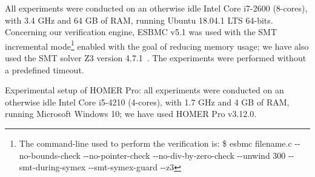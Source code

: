 \documentclass[journal]{IEEEtran}
\begin{document}
All experiments were conducted on an otherwise idle Intel Core i7-2600 (8-cores), with 3.4 GHz and 64 GB of RAM, running Ubuntu 18.04.1 LTS 64-bits. Concerning our verification engine, ESBMC v5.1 was used with the SMT incremental mode\footnote{The command-line used to perform the verification is: \$ esbmc filename.c -\phantom{}-no-bounds-check -\phantom{}-no-pointer-check -\phantom{}-no-div-by-zero-check -\phantom{}-unwind 300 -\phantom{}-smt-during-symex -\phantom{}-smt-symex-guard -\phantom{}-z3} enabled with the goal of reducing memory usage; we have also used the SMT solver Z3 version 4.7.1~\cite{DeMoura}. The experiments were performed without a predefined timeout.

Experimental setup of HOMER Pro: all experiments were conducted on an otherwise idle Intel Core i5-4210 (4-cores), with 1.7 GHz and 4 GB of RAM, running Microsoft Windows 10; we have used HOMER Pro v3.12.0.

\end{document}
